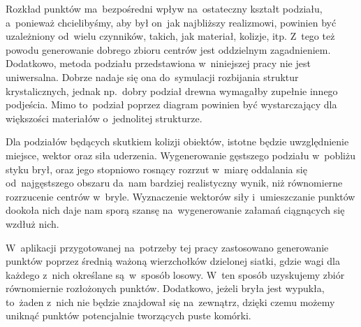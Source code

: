\documentclass[skorowidz,autorrok,backref,xodstep,oswiadczenie]{wmimgr}
\begin{document}
Rozkład punktów ma~bezpośredni wpływ na~ostateczny kształt podziału, a~ponieważ chcielibyśmy, aby był on~jak najbliższy realizmowi, powinien być uzależniony od~wielu czynników, takich, jak materiał, kolizje, itp. Z~tego też powodu generowanie dobrego zbioru centrów jest oddzielnym zagadnieniem. Dodatkowo, metoda podziału przedstawiona w~niniejszej pracy nie jest uniwersalna. Dobrze nadaje się ona do~symulacji rozbijania struktur krystalicznych, jednak np.~dobry podział drewna wymagałby zupełnie innego podjeścia. Mimo to~podział poprzez diagram powinien być wystarczający dla większości materiałów o~jednolitej strukturze.

Dla podziałów będących skutkiem kolizji obiektów, istotne będzie uwzględnienie miejsce, wektor oraz siła uderzenia. Wygenerowanie gęstszego podziału w~pobliżu styku brył, oraz jego stopniowo rosnący rozrzut w~miarę oddalania się od~najgęstszego obszaru da~nam bardziej realistyczny wynik, niż równomierne rozrzucenie centrów w~bryle. Wyznaczenie wektorów siły i~umieszczanie punktów dookoła nich daje nam sporą szansę na~wygenerowanie załamań ciągnących się wzdłuż nich.

W~aplikacji przygotowanej na~potrzeby tej pracy zastosowano generowanie punktów poprzez średnią ważoną wierzchołków dzielonej siatki, gdzie wagi dla każdego z~nich określane są~w~sposób losowy. W~ten sposób uzyskujemy zbiór równomiernie rozłożonych punktów. Dodatkowo, jeżeli bryła jest wypukła, to~żaden z~nich nie będzie znajdował się na~zewnątrz, dzięki czemu możemy uniknąć punktów potencjalnie tworzących puste komórki.

%

\end{document}
